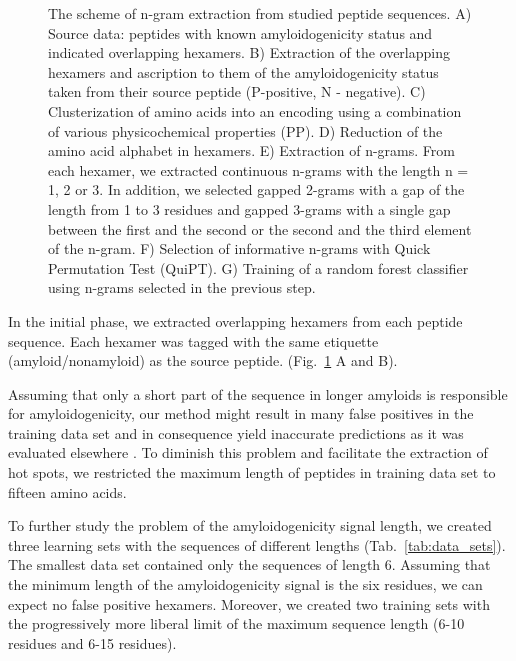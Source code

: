 \documentclass[a4,center,fleqn]{NAR}
\begin{document}
\begin{figure}
\caption{The scheme of n-gram extraction from studied peptide sequences. 
A) Source data: peptides with known amyloidogenicity status and indicated overlapping hexamers.
B) Extraction of the overlapping hexamers and ascription to them of the amyloidogenicity status taken from their source peptide (P-positive, N - negative). 
C) Clusterization of amino acids into an encoding using a combination of various
physicochemical properties (PP). 
D) Reduction of the amino acid alphabet in hexamers. 
E) Extraction of n-grams. From each hexamer, we extracted continuous n-grams with the 
length n = 1, 2 or 3. In addition, we selected 
gapped 2-grams with a gap of the length from 1 to 3 residues and gapped 
3-grams with a single gap between the first and the second or the second and 
the third element of the n-gram.
F) Selection of informative n-grams with Quick Permutation Test (QuiPT).
G) Training of a random forest classifier using n-grams selected in the previous step.}\label{fig:ngram_scheme} 
\end{figure}

  In the initial phase, we extracted overlapping hexamers from each peptide 
sequence. Each hexamer was tagged with the same etiquette (amyloid/nonamyloid) 
as the source peptide. (Fig.~\ref{fig:ngram_scheme} A and B). 

  Assuming that only a short part of the sequence in longer amyloids is 
responsible for amyloidogenicity, our method might result in many false 
positives in the training data set and in consequence yield inaccurate 
predictions as it was evaluated elsewhere \citep{kotulska_amyloid_2013}. To 
diminish this problem and facilitate the extraction of hot spots, we restricted the 
maximum length of peptides in training data set to fifteen amino acids.

  To further study the problem of the amyloidogenicity signal length, we 
created three learning sets with the sequences of different lengths 
(Tab.~\ref{tab:data_sets}). The smallest data set contained only the 
sequences of length 6. Assuming that the minimum length of the amyloidogenicity 
signal is the six residues, we can expect no false positive hexamers. Moreover, we 
created two training sets with the progressively more liberal limit of the 
maximum sequence length (6-10 residues and 6-15 residues).
\end{document}
